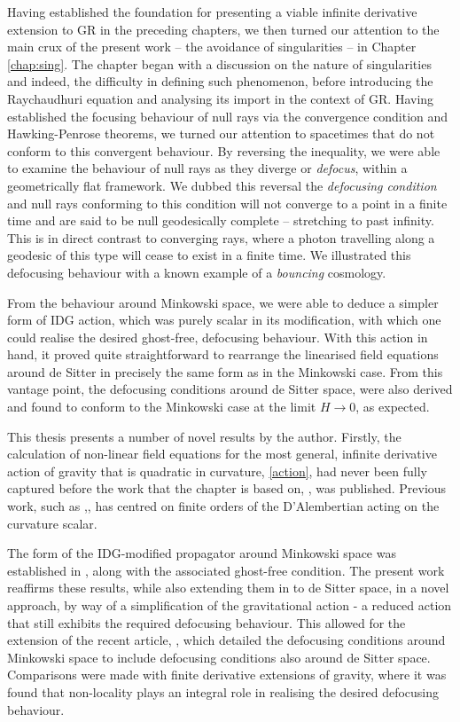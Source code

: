 Having established the foundation for presenting a viable infinite derivative extension to GR in the preceding chapters, we then turned our attention to the main crux of the present work -- the avoidance of singularities -- in Chapter \ref{chap:sing}. The chapter began with a discussion on the nature of singularities and indeed, the difficulty in defining such phenomenon, before introducing the Raychaudhuri equation and analysing its import in the context of GR. Having established the focusing behaviour of null rays via the convergence condition and Hawking-Penrose theorems, we turned our attention to spacetimes that do not conform to this convergent behaviour. By reversing the inequality, we were able to examine the behaviour of null rays as they diverge or \emph{defocus}, within a geometrically flat framework. We dubbed this reversal the \emph{defocusing condition} and null rays conforming to this condition will not converge to a point in a finite time and are said to be null geodesically complete -- stretching to past infinity. This is in direct contrast to converging rays, where a photon travelling along a geodesic of this type will cease to exist in a finite time. We illustrated this defocusing behaviour with a known example of a \emph{bouncing} cosmology.

From the behaviour around Minkowski space, we were able to deduce a simpler form of IDG action, which was purely scalar in its modification, with which one could realise the desired ghost-free, defocusing behaviour. With this action in hand, it proved quite straightforward to rearrange the linearised field equations around de Sitter in precisely the same form as in the Minkowski case. From this vantage point, the defocusing conditions around de Sitter space, were also derived and found to conform to the Minkowski case at the limit $H\rightarrow 0$, as expected. 

This thesis presents a number of novel results by the author. Firstly, the calculation of non-linear field equations for the most general, infinite derivative action of gravity that is quadratic in curvature, \eqref{action},  had never been fully captured before the work that the chapter is based on, \cite{Biswas:2013cha}, was published. Previous work, such as \cite{Schmidt:1990dh},\cite{Quandt:1990gc},\cite{Decanini:2007zz} has centred on finite orders of the D'Alembertian acting on the curvature scalar.

The form of the IDG-modified propagator around Minkowski space was established in \cite{Biswas:2010zk}, along with the associated ghost-free condition. The present work reaffirms these results, while also extending them in to de Sitter space, in a novel approach, by way of a simplification of the gravitational action - a reduced action that still exhibits the required defocusing behaviour. This allowed for the extension of the recent article, \cite{Conroy:2016sac}, which detailed the defocusing conditions around Minkowski space to include defocusing conditions also around de Sitter space. Comparisons were made with finite derivative extensions of gravity, where it was found that non-locality plays an integral role in realising the desired defocusing behaviour.

